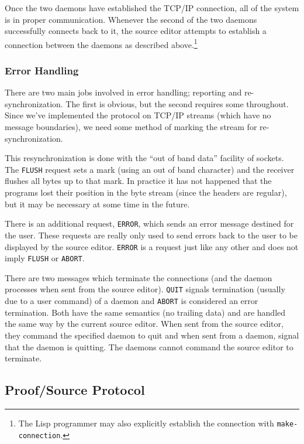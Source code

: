 Once the two daemons have established the TCP/IP connection, all of
the system is in proper communication.  Whenever the second of the two
daemons successfully connects back to it, the source editor attempts
to establish a connection between the daemons as described
above.\footnote{The Lisp programmer may also explicitly establish the
connection with {\tt make-connection}.}

\subsubsection{Error Handling}

There are two main jobs involved in error handling; reporting and
re-synchronization.  The first is obvious, but the second requires
some throughout.  Since we've implemented the {\VorTeX} protocol on
TCP/IP streams (which have no message boundaries), we need some method
of marking the stream for re-synchronization.

This resynchronization is done with the ``out of band data'' facility
of {\UNIX} sockets.  The {\tt FLUSH} request sets a mark (using an
out of band character) and the receiver flushes all bytes up to that
mark.  In practice it has not happened that the programs lost their
position in the byte stream (since the headers are regular), but it
may be necessary at some time in the future.

There is an additional request, {\tt ERROR}, which sends an {\ASCII}
error message destined for the user.  These requests are really only
used to send errors back to the user to be displayed by the source
editor.  {\tt ERROR} is a request just like any other and does not
imply {\tt FLUSH} or {\tt ABORT}.

There are two messages which terminate the connections (and the daemon
processes when sent from the source editor).  {\tt QUIT} signals
termination (usually due to a user command) of a daemon and {\tt ABORT}
is considered an error termination.  Both have the same semantics
(no trailing data) and are handled the same way by the current source
editor.  When sent from the source editor, they command the specified
daemon to quit and when sent from a daemon, signal that the daemon is
quitting.  The daemons cannot command the source editor to terminate.

\subsection{Proof/Source Protocol}

